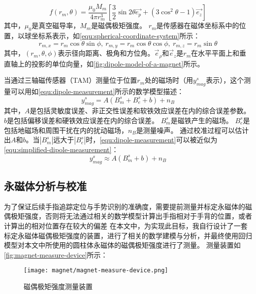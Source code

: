 \begin{equation}
    \label{equ:dipole-model}
    f(r_m, \theta) = \frac{\mu_0 M_m}{4\pi r_m^3}[\frac{3}{2}\sin{2\theta}\vec{e_p} + (3\cos^2{\theta} - 1)\vec{e_z}]
\end{equation}
其中，$\mu_0$是真空磁导率，$M_m$是磁偶极矩强度。
$r_m$是传感器在磁体坐标系中的位置，以球坐标系表示，如\autoref{equ:spherical-coordinate-system}所示：
\begin{equation}
    \label{equ:spherical-coordinate-system}
    r_{m,x} = r_m\cos{\theta}\sin{\phi},\ r_{m,y} = r_m\cos{\theta}\cos{\phi},\ r_{m,z} = r_m\sin{\theta}
\end{equation}
其中，$(r_m, \theta, \phi)$表示径向距离、极角和方位角。$\vec{e}_{\rho}$和$\vec{e}_z$是$r_m$在水平平面上和垂直轴上的投影的单位向量，如\autoref{fig:dipole-model-of-a-magnet}所示。

当通过三轴磁传感器（TAM）测量位于位置$r_m$处的磁场时（用$y^s_{mag}$表示），这个测量可以用如\autoref{equ:dipole-measurement}所示的数学模型描述：
\begin{equation}
    \label{equ:dipole-measurement}
    y_{mag}^s = A(B_m^s + B_e^s + b) + n_{B}
\end{equation}
其中，$A$是包括灵敏度误差、非正交性误差和软铁效应误差在内的综合误差参数。
$b$是包括偏移误差和硬铁效应误差在内的综合误差。
$B_m^s$是磁铁产生的磁场。
$B_e^s$是包括地磁场和周围干扰在内的扰动磁场，$n_B$是测量噪声。
通过校准过程可以估计出$A$和$b$。当$|B_m^s|$远大于$|B_e^s|$时，\autoref{equ:dipole-measurement}可以被近似为\autoref{equ:simplified-dipole-measurement}：
\begin{equation}
    \label{equ:simplified-dipole-measurement}
    y_{mag}^s \approx A(B_m^s + b) + n_{B}
\end{equation}

\subsection{永磁体分析与校准}
为了保证后续手指追踪定位与手势识别的准确度，需要提前测量并标定永磁体的磁偶极矩强度，否则将无法通过相关的数学模型计算出手指相对于手背的位置，或者计算出的相对位置存在较大的偏差
在本文中，为实现此目标，我自行设计了一套标定永磁体磁偶极矩强度的装置，进行了相关的数学建模与分析，并最终使用回归模型对本文中所使用的圆柱体永磁体的磁偶极矩强度进行了测量。
测量装置如\autoref{fig:magnet-measure-device}所示：

\begin{figure}[H]
    \centering
    \texttt{[image: magnet/magnet-measure-device.png]}
    \caption{\label{fig:magnet-measure-device}磁偶极矩强度测量装置}
\end{figure}


